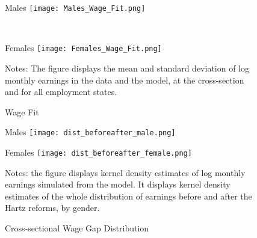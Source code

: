 \documentclass[12pt, a4paper]{article}
\begin{document}
\begin{figure}[!htbp]
	\centering
	\begin{minipage}[b]{1\textwidth}{Males}
		\centering
		\texttt{[image: Males\_Wage\_Fit.png]}
	\end{minipage}\\
\vspace{5mm}
	\begin{minipage}[b]{1\textwidth}{Females}
		\centering
		\texttt{[image: Females\_Wage\_Fit.png]}
	\end{minipage}
	\footnotesize{
\justifying Notes: The figure displays the mean and standard deviation of log monthly earnings in the data and the model, at the cross-section and for all employment states.\par}
	\captionsetup{font=small,justification=raggedright}
	\caption{Wage Fit}\label{fig:wage_fit}
\end{figure}

\begin{figure}[!htbp]
	\centering
	\begin{minipage}[b]{0.48\textwidth}{Males}
		\centering
		\texttt{[image: dist\_beforeafter\_male.png]}
	\end{minipage}
	\begin{minipage}[b]{0.48\textwidth}{Females}
		\centering
		\texttt{[image: dist\_beforeafter\_female.png]}
	\end{minipage}
	\footnotesize{
		\justifying Notes: the figure displays kernel density estimates of log monthly earnings simulated from the model. It displays kernel density estimates of the whole distribution of earnings before and after the Hartz reforms, by gender.\par}
	\captionsetup{font=small,justification=raggedright}
	\caption{Cross-sectional Wage Gap Distribution}\label{fig:estimation_wage_gap}
\end{figure}
\end{document}
